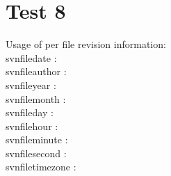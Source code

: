 \documentclass[12pt]{report}
\begin{document}
\chapter{Test 8}
Usage of per file revision information:\\

\noindent
 svnfiledate : \svnfiledate  \\
 svnfileauthor : \svnfileauthor  \\
 svnfileyear : \svnfileyear  \\
 svnfilemonth : \svnfilemonth  \\
 svnfileday : \svnfileday  \\
 svnfilehour : \svnfilehour  \\
 svnfileminute : \svnfileminute  \\
 svnfilesecond : \svnfilesecond  \\
 svnfiletimezone : \svnfiletimezone  \\
\end{document}

